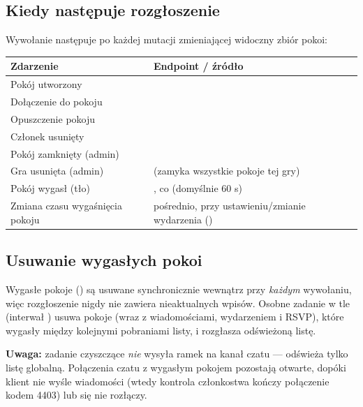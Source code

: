 \subsection{Kiedy następuje rozgłoszenie}

Wywołanie  następuje po każdej
mutacji zmieniającej widoczny zbiór pokoi:

\begin{tabularx}{\textwidth}{lY}
\toprule
Zdarzenie & Endpoint / źródło \\
\midrule
Pokój utworzony &  \\
Dołączenie do pokoju &  \\
Opuszczenie pokoju &  \\
Członek usunięty &  \\
Pokój zamknięty (admin) &  \\
Gra usunięta (admin) &  (zamyka wszystkie pokoje tej gry) \\
Pokój wygasł (tło) & , co  (domyślnie 60 s) \\
Zmiana czasu wygaśnięcia pokoju & pośrednio, przy ustawieniu/zmianie wydarzenia () \\
\bottomrule
\end{tabularx}

\subsection{Usuwanie wygasłych pokoi}

Wygasłe pokoje () są usuwane synchronicznie wewnątrz
 przy \emph{każdym} wywołaniu, więc rozgłoszenie nigdy nie zawiera
nieaktualnych wpisów. Osobne zadanie w tle  (interwał
) usuwa pokoje (wraz z wiadomościami, wydarzeniem i RSVP),
które wygasły między kolejnymi pobraniami listy, i rozgłasza odświeżoną listę.

\textbf{Uwaga:} zadanie czyszczące \emph{nie} wysyła ramek  na kanał czatu --- odświeża
tylko listę globalną. Połączenia czatu z wygasłym pokojem pozostają otwarte, dopóki klient nie wyśle
wiadomości (wtedy kontrola członkostwa kończy połączenie kodem 4403) lub się nie rozłączy.

